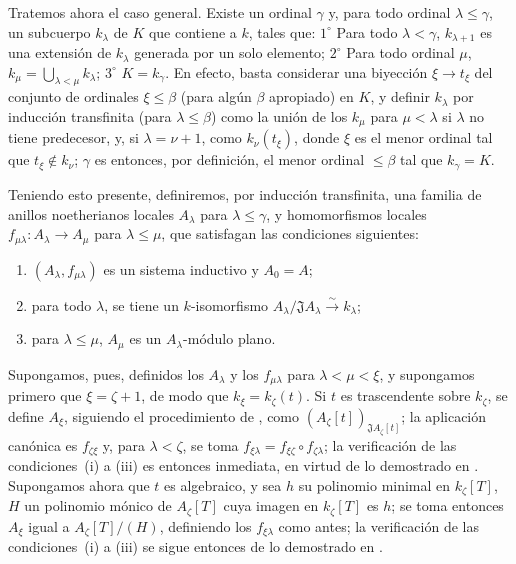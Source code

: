 \begin{env}[10.3.1.4]
\label{0.10.3.1.4}
\label{0.10.3.1.4-fr}
Tratemos ahora el caso general.
Existe un ordinal $\gamma$ y, para todo ordinal $\lambda\leq\gamma$, un subcuerpo $k_\lambda$ de $K$ que contiene a $k$, tales que: $1^\circ$ Para todo $\lambda<\gamma$,
$k_{\lambda+1}$ es una extensión de $k_\lambda$ generada por un solo elemento; $2^\circ$ Para todo ordinal $\mu$, $k_\mu=\bigcup_{\lambda<\mu}k_\lambda$;
$3^\circ$ $K=k_\gamma$.
En efecto, basta considerar una biyección $\xi\to t_\xi$ del conjunto de ordinales $\xi\leq\beta$ (para algún $\beta$ apropiado) en $K$, y definir $k_\lambda$ por inducción transfinita (para $\lambda\leq\beta$) como la unión de los $k_\mu$ para $\mu<\lambda$ si $\lambda$ no tiene predecesor, y, si $\lambda=\nu+1$, como $k_\nu(t_\xi)$, donde $\xi$ es el menor ordinal tal que $t_\xi\notin k_\nu$;
$\gamma$ es entonces, por definición, el menor ordinal $\leq\beta$ tal que $k_\gamma=K$.

Teniendo esto presente, definiremos, por inducción transfinita, una familia de anillos noetherianos locales $A_\lambda$ para $\lambda\leq\gamma$, y homomorfismos locales $f_{\mu\lambda}:A_\lambda\to A_\mu$ para $\lambda\leq\mu$, que satisfagan las condiciones siguientes:
\begin{enumerate}
  \item[(i)] $(A_\lambda,f_{\mu\lambda})$ es un sistema inductivo y $A_0=A$;
  \item[(ii)] para todo $\lambda$, se tiene un $k$-isomorfismo $A_\lambda/\mathfrak J A_\lambda\xrightarrow{\sim}k_\lambda$;
  \item[(iii)] para $\lambda\leq\mu$,
$A_\mu$ es un $A_\lambda$-módulo plano.
\end{enumerate}

Supongamos, pues, definidos los $A_\lambda$ y los $f_{\mu\lambda}$ para $\lambda<\mu<\xi$, y supongamos primero que $\xi=\zeta+1$, de modo que $k_\xi=k_\zeta(t)$.
Si $t$ es trascendente sobre $k_\zeta$, se define $A_\xi$, siguiendo el procedimiento de , como $(A_\zeta[t])_{\mathfrak J A_\zeta[t]}$;
la aplicación canónica es $f_{\zeta\xi}$ y, para $\lambda<\zeta$, se toma $f_{\xi\lambda}=f_{\xi\zeta}\circ f_{\zeta\lambda}$;
la verificación de las condiciones~(i) a (iii) es entonces inmediata, en virtud de lo demostrado en .
Supongamos ahora que $t$ es algebraico, y sea $h$ su polinomio minimal en $k_\zeta[T]$,
$H$ un polinomio mónico de $A_\zeta[T]$ cuya imagen en $k_\zeta[T]$ es $h$;
se toma entonces $A_\xi$ igual a $A_\zeta[T]/(H)$, definiendo los $f_{\xi\lambda}$ como antes;
la verificación de las condiciones~(i) a (iii) se sigue entonces de lo demostrado en .


\end{env}

